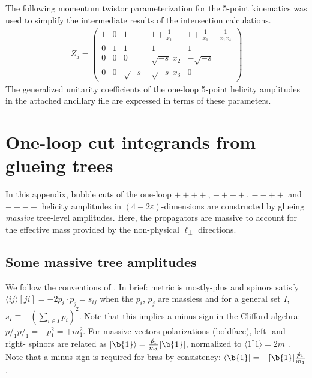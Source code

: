 \documentclass[11pt]{article}
\newcommand{\vep}{\varepsilon}
\newcommand{\ab}[1]{\langle#1\rangle}
\renewcommand{\sb}[1]{[#1]}
\newcommand{\keta}[1]{|#1\rangle}
\newcommand{\kets}[1]{|#1]}
\newcommand{\braa}[1]{\langle#1|}
\newcommand{\bras}[1]{[#1|}
\newcommand{\pslash}{p\!\!\!/}
\begin{document}
The following momentum twistor parameterization for the 5-point kinematics was used to simplify the intermediate results of the intersection calculations.
\begin{align}
	Z_5 = 
	\begin{pmatrix}
		1 & 0 & 1 & 1+\frac{1}{x_1} & 1+\frac{1}{x_1} + \frac{1}{x_1 x_4} \\
		0 & 1 & 1 & 1 & 1 \\
		0 & 0 & 0 & \sqrt{-s}\ x_2 & -\sqrt{-s}\ \\
		0 & 0 & \sqrt{-s}\ & \sqrt{-s}\  x_3  & 0
	\end{pmatrix}
\end{align}
The generalized unitarity coefficients of the one-loop 5-point helicity amplitudes in the attached ancillary file are expressed in terms of these parameters.

\section{One-loop cut integrands from glueing trees\label{sec:unitary_cuts}}

In this appendix, bubble cuts of the one-loop $++++$, $-+++$, $--++$ and $-+-+$ helicity amplitudes in $(4-2\vep)$-dimensions are constructed by glueing \emph{massive} tree-level amplitudes. 
Here, the propagators are massive to account for the effective mass provided by the non-physical $\ell_\perp$ directions.


\subsection{Some massive tree amplitudes}
\label{ssec:trees}

We follow the conventions of \cite{Elvang:2013cua}.  
In brief: metric is mostly-plus and spinors satisfy $\ab{ij}\sb{ji}=-2p_i{\cdot}p_j=s_{ij}$ when the $p_i$, $p_j$ are massless and for a general set $I$, $s_I\equiv -(\sum_{i\in I} p_i)^2$.
Note that this implies a minus sign in the Clifford algebra: $\pslash_1\pslash_1 = -p_1^2 = +m_1^2$.
For massive vectors polarizations (boldface), left- and right- spinors are related as
$\keta{\b{1}}=\frac{\pslash_1}{m_1} \kets{\b{1}}$, normalized to $\ab{1^\dagger1}=2m$
\cite{Arkani-Hamed:2017jhn}.
Note that a minus sign is required for bras by consistency: $\braa{\b{1}}= -\bras{\b{1}}\frac{\pslash_1}{m_1}$.
\end{document}
